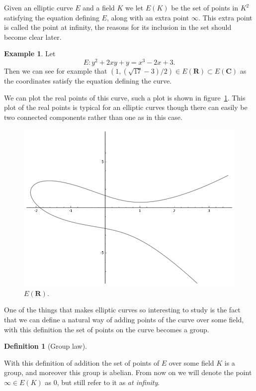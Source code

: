 \documentclass[a4paper,abstracton,bibtotoc]{scrreprt}
\theoremstyle{definition}
\newtheorem{defn}{Definition}
\newtheorem{ex}{Example}
\newcommand{\RR}{\mathbf{R}}
\newcommand{\CC}{\mathbf{C}}
\begin{document}
Given an elliptic curve $E$ and a field $K$ we let $E(K)$ be the set of points in $K^2$ satisfying the equation defining $E$, along with an extra point $\infty$.
This extra point is called the point at infinity, the reasons for its inclusion in the set should become clear later.

\begin{ex}
Let 
\[
E \colon y^2 + 2xy + y = x^3 - 2x + 3.
\]
Then we can see for example that $(1,(\sqrt{17}-3)/2)\in E(\RR) \subset E(\CC)$ as the coordinates satisfy the equation defining the curve.

We can plot the real points of this curve, such a plot is shown in figure~\ref{fig:ec}.
This plot of the real points is typical for an elliptic curves though there can easily be two connected components rather than one as in this case.
\begin{figure}
\centering
\includegraphics[scale=0.6]{sageec}
\caption{\label{fig:ec}$E(\RR)$.}
\end{figure}
\end{ex}

One of the things that makes elliptic curves so interesting to study is the fact that we can define a natural way of adding points of the curve over some field, with this definition the set of points on the curve becomes a group.

\begin{defn}[Group law]
\end{defn}

With this definition of addition the set of points of $E$ over some field $K$ is a group, and moreover this group is abelian.
From now on we will denote the point $\infty\in E(K)$ as $0$, but still refer to it as \emph{at infinity}.
\end{document}
